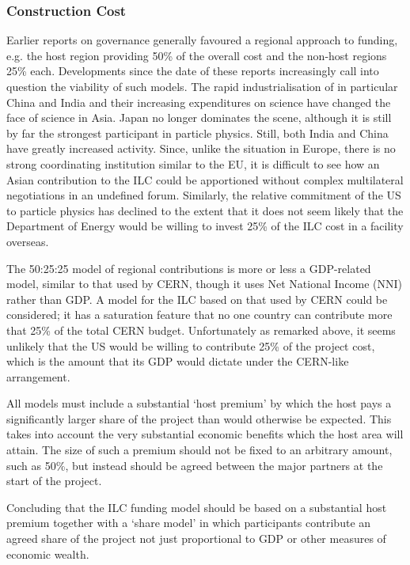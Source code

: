 \subsubsection{Construction Cost}

Earlier reports on governance generally favoured a regional approach to funding, e.g. the host region providing 50\% of the overall cost and the non-host regions 25\% each. Developments since the date of these reports increasingly call into question the viability of such models. The rapid industrialisation of in particular China and India and their increasing expenditures on science have changed the face of science in Asia. Japan no longer dominates the scene, although it is still by far the strongest participant in particle physics. Still, both India and China have greatly increased activity. Since, unlike the situation in Europe, there is no strong coordinating institution similar to the EU, it is difficult to see how an Asian contribution to the ILC could be apportioned without complex multilateral negotiations in an undefined forum. Similarly, the relative commitment of the US to particle physics has declined to the extent that it does not seem likely that the Department of Energy would be willing to invest 25\% of the ILC cost in a facility overseas.
 
The 50:25:25 model of regional contributions is more or less a GDP-related model, similar to that used by CERN, though it uses Net National Income (NNI) rather than GDP. A model for the ILC based on that used by CERN could be considered; it has a saturation feature that no one country can contribute more that 25\% of the total CERN budget. Unfortunately as remarked above, it seems unlikely that the US would be willing to contribute 25\% of the project cost, which is the amount that its GDP would dictate under the CERN-like arrangement.
 
All models must include a substantial `host premium' by which the host pays a significantly larger share of the project than would otherwise be expected. This takes into account the very substantial economic benefits which the host area will attain. The size of such a premium should not be fixed to an arbitrary amount, such as 50\%, but instead should be agreed between the major partners at the start of the project.

Concluding that the ILC funding model should be based on a substantial host premium together with a `share model' in which participants contribute an agreed share of the project not just proportional to GDP or other measures of economic wealth.
 
